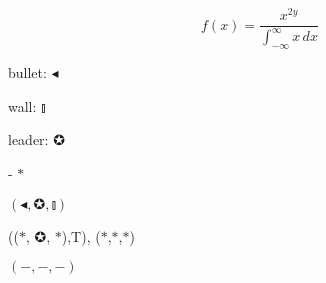 \documentclass{article}
\begin{document}
\begin{equation*}
  f(x) = \frac{x^{2y}}{\int_{-\infty}^{\infty} x \,dx}  
\end{equation*}

bullet: $\smallblacktriangleleft$

wall: $\talloblong$

leader: $\circledstar$

- $\ast$

$(\smallblacktriangleleft,\circledstar,\talloblong)$

(($\ast$, $\circledstar$, $\ast$),T), ($\ast$,$\ast$,$\ast$)

$(-,-,-)$
\end{document}
